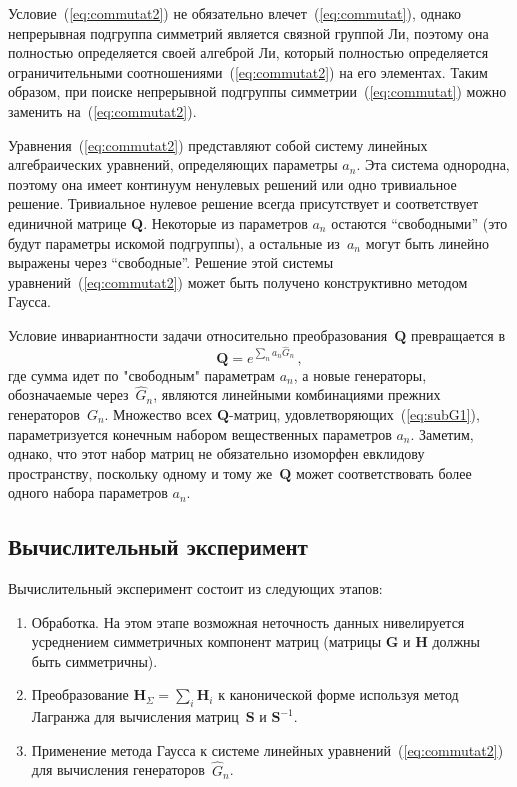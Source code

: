 {%
Условие~(\ref{eq:commutat2}) не обязательно влечет~(\ref{eq:commutat}), однако непрерывная подгруппа симметрий является связной группой Ли, поэтому она полностью определяется своей алгеброй Ли, который полностью определяется ограничительными соотношениями~(\ref{eq:commutat2}) на его элементах. Таким образом, при поиске непрерывной подгруппы симметрии~(\ref{eq:commutat}) можно заменить на~(\ref{eq:commutat2}).

Уравнения~(\ref{eq:commutat2}) представляют собой систему линейных алгебраических уравнений, определяющих параметры $a_n$. Эта система однородна, поэтому она имеет континуум ненулевых решений или одно тривиальное решение. Тривиальное нулевое решение всегда присутствует и соответствует единичной матрице $\textbf{Q}$. Некоторые из параметров $a_n$ остаются ``свободными'' (это будут параметры искомой подгруппы), а остальные из~$a_n$ могут быть линейно выражены через ``свободные''. Решение этой системы уравнений~(\ref{eq:commutat2}) может быть получено конструктивно методом Гаусса.

Условие инвариантности задачи относительно преобразования~$\textbf{Q}$ превращается в
%
\begin{equation}
\label{eq:subG1}
\textbf{Q}=e^{\sum_n a_n \hat{G}_n} \, ,
\end{equation}
%
где сумма идет по "свободным" параметрам $a_n$, а новые генераторы, обозначаемые через~$\hat{G}_n$, являются линейными комбинациями прежних генераторов~$G_n$. Множество всех $\textbf{Q}$-матриц, удовлетворяющих~(\ref{eq:subG1}), параметризуется конечным набором вещественных параметров $a_n$. Заметим, однако, что этот набор матриц не обязательно изоморфен евклидову пространству, поскольку одному и тому же~$\textbf{Q}$ может соответствовать более одного набора параметров $a_n$.

\subsection{Вычислительный эксперимент}
Вычислительный эксперимент состоит из следующих этапов:
\begin{enumerate}
  \item Обработка. На этом этапе возможная неточность данных нивелируется усреднением симметричных компонент матриц (матрицы $\textbf{G}$ и $\textbf{H}$ должны быть симметричны).
  \item %
  Преобразование $ {\textbf{H}}_{\Sigma} = \sum_{i} \textbf{H}_i$ к канонической форме используя метод Лагранжа для вычисления матриц~$\textbf{S}$ и $\textbf{S}^{-1} $.
  \item Применение метода Гаусса к системе линейных уравнений~(\ref{eq:commutat2}) для вычисления генераторов~$\hat{G}_n$.
\end{enumerate}

}
